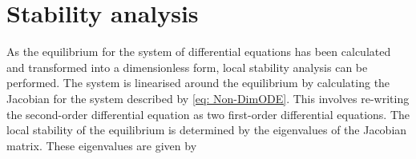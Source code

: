 \section{Stability analysis}







As the equilibrium for the system of differential equations has been calculated and transformed into a dimensionless form, local stability analysis can be performed. The system is linearised around the equilibrium by calculating the Jacobian for the system described by \cref{eq: Non-DimODE}. This involves re-writing the second-order differential equation as two first-order differential equations. The local stability of the equilibrium is determined by the eigenvalues of the Jacobian matrix. These eigenvalues are given by

